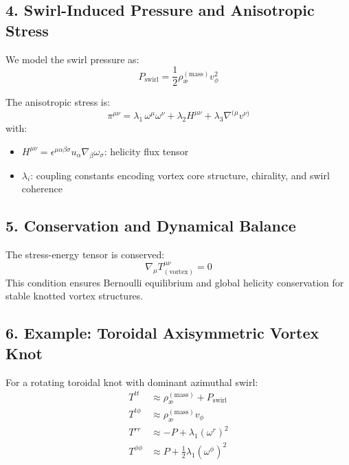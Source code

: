 \documentclass[twocolumn,aps,pre,floatfix,nofootinbib]{revtex4-2}
\begin{document}
    \subsection*{4. Swirl-Induced Pressure and Anisotropic Stress}

    We model the swirl pressure as:
    \begin{equation}
        P_{\text{swirl}} = \frac{1}{2} \rho_{\text{\ae}}^{(\text{mass})} v_\phi^2
    \end{equation}

    The anisotropic stress is:
    \begin{equation}
        \pi^{\mu\nu} = \lambda_1 \, \omega^\mu \omega^\nu + \lambda_2 H^{\mu\nu} + \lambda_3 \nabla^{(\mu} v^{\nu)}
    \end{equation}
    with:
    \begin{itemize}
        \item \( H^{\mu\nu} = \epsilon^{\mu\alpha\beta\sigma} u_\alpha \nabla_\beta \omega_\sigma \): helicity flux tensor
        \item \( \lambda_i \): coupling constants encoding vortex core structure, chirality, and swirl coherence
    \end{itemize}

    \subsection*{5. Conservation and Dynamical Balance}

    The stress-energy tensor is conserved:
    \begin{equation}
        \nabla_\mu T^{\mu\nu}_{(\text{vortex})} = 0
    \end{equation}
    This condition ensures Bernoulli equilibrium and global helicity conservation for stable knotted vortex structures.

    \subsection*{6. Example: Toroidal Axisymmetric Vortex Knot}

    For a rotating toroidal knot with dominant azimuthal swirl:
    \begin{align*}
        T^{tt} &\approx \rho_{\text{\ae}}^{(\text{mass})} + P_{\text{swirl}} \\
        T^{t\phi} &\approx \rho_{\text{\ae}}^{(\text{mass})} v_\phi \\
        T^{rr} &\approx -P + \lambda_1 (\omega^r)^2 \\
        T^{\phi\phi} &\approx P + \frac{1}{2}\lambda_1 (\omega^\phi)^2
    \end{align*}
\end{document}
